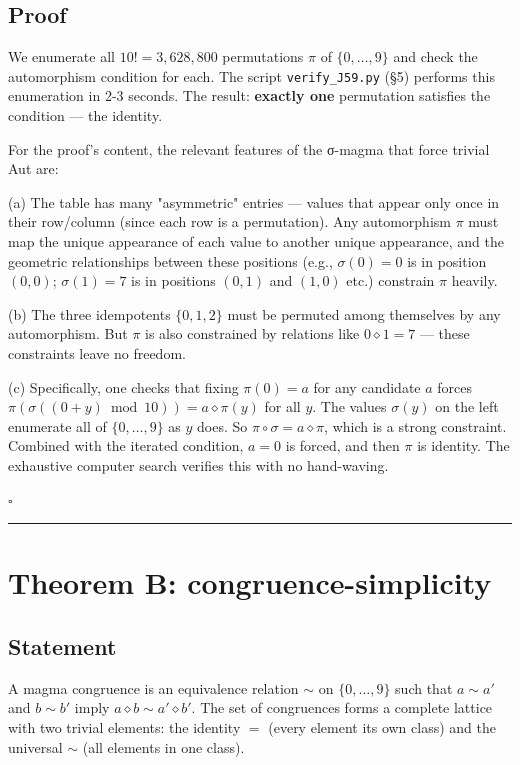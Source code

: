 \documentclass[11pt,reqno]{amsart}
\theoremstyle{plain}
\theoremstyle{definition}
\begin{document}
\subsection{Proof}

We enumerate all $10! = 3{,}628{,}800$ permutations $\pi$ of $\{0, \ldots, 9\}$ and check the automorphism condition for each. The script \texttt{verify_J59.py} (§5) performs this enumeration in 2-3 seconds. The result: \textbf{exactly one} permutation satisfies the condition --- the identity.

For the proof's content, the relevant features of the σ-magma that force trivial Aut are:

(a) The table has many "asymmetric" entries --- values that appear only once in their row/column (since each row is a permutation). Any automorphism $\pi$ must map the unique appearance of each value to another unique appearance, and the geometric relationships between these positions (e.g., $\sigma(0) = 0$ is in position $(0, 0)$; $\sigma(1) = 7$ is in positions $(0, 1)$ and $(1, 0)$ etc.) constrain $\pi$ heavily.

(b) The three idempotents $\{0, 1, 2\}$ must be permuted among themselves by any automorphism. But $\pi$ is also constrained by relations like $0 \diamond 1 = 7$ --- these constraints leave no freedom.

(c) Specifically, one checks that fixing $\pi(0) = a$ for any candidate $a$ forces $\pi(\sigma((0+y) \bmod 10)) = a \diamond \pi(y)$ for all $y$. The values $\sigma(y)$ on the left enumerate all of $\{0, \ldots, 9\}$ as $y$ does. So $\pi \circ \sigma = a \diamond \pi$, which is a strong constraint. Combined with the iterated condition, $a = 0$ is forced, and then $\pi$ is identity. The exhaustive computer search verifies this with no hand-waving.

$\square$

\medskip\hrule\medskip

\section{Theorem B: congruence-simplicity}

\subsection{Statement}

A magma congruence is an equivalence relation $\sim$ on $\{0, \ldots, 9\}$ such that $a \sim a'$ and $b \sim b'$ imply $a \diamond b \sim a' \diamond b'$. The set of congruences forms a complete lattice with two trivial elements: the identity $=$ (every element its own class) and the universal $\sim$ (all elements in one class).
\end{document}
